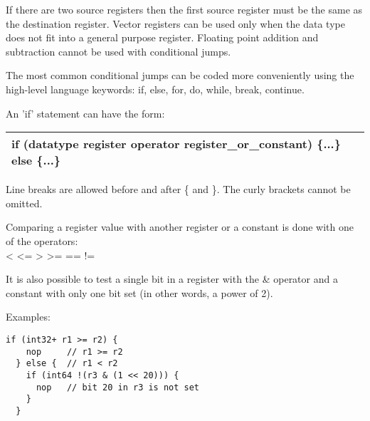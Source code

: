 \documentclass[forwardcom.tex]{subfiles}
\begin{document}
If there are two source registers then the first source register must be the same as the destination register. Vector registers can be used only when the data type does not fit into a general purpose register. Floating point addition and subtraction cannot be used with conditional jumps.
\vspace{2mm}

The most common conditional jumps can be coded more conveniently using the high-level language keywords: if, else, for, do, while, break, continue.
\vspace{2mm}

An 'if' statement can have the form:
\vspace{2mm}

\begin{tabular}{|p{150mm}|}
\hline
\hspace{4mm} if (datatype register operator register\_or\_constant) \{...\} else \{...\}\\
\hline
\end{tabular}
\vspace{2mm}

Line breaks are allowed before and after \{ and \}. The curly brackets cannot be omitted.

Comparing a register value with another register or a constant is done with one of the operators:\\
\textless \hspace{2mm} \textless= \hspace{2mm} \textgreater \hspace{2mm} \textgreater= \hspace{2mm} 
 == \hspace{2mm} != \hspace{2mm} 
\vspace{2mm}

It is also possible to test a single bit in a register with the \& operator and a constant with only one bit set (in other words, a power of 2).
\vspace{2mm}

Examples:
\vspace{2mm}

\begin{lstlisting}[frame=single]
  if (int32+ r1 >= r2) {
    nop     // r1 >= r2
  } else {  // r1 < r2
    if (int64 !(r3 & (1 << 20))) {
      nop   // bit 20 in r3 is not set
    }
  }  
\end{lstlisting}
\vspace{2mm}
\end{document}
